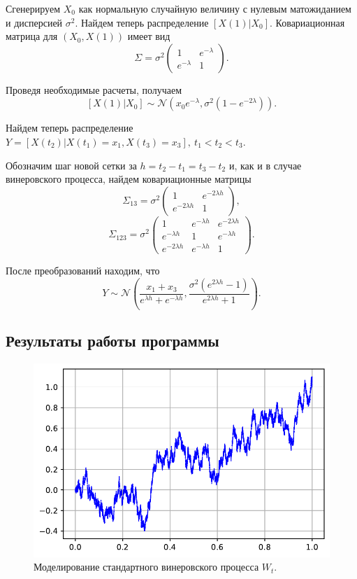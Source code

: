 \documentclass[16pt]{article}
\begin{document}
Сгенерируем $X_0$ как нормальную случайную величину с нулевым матожиданием и дисперсией $\sigma^2$.
Найдем теперь распределение $[X(1)|X_0]$.
Ковариационная матрица для $(X_0, X(1))$ имеет вид 
$$
\Sigma = \sigma^2 \begin{pmatrix} 
1 & e^{-\lambda} \\
e^{-\lambda} & 1
\end{pmatrix}.
$$

Проведя необходимые расчеты, получаем $$[X(1)|X_0] \sim \mathcal{N}\left(x_0e^{-\lambda}, \sigma^2 (1 -e^{-2\lambda})\right).$$

Найдем теперь распределение $Y = [X(t_2)|X(t_1) = x_1, X(t_3) = x_3],\ t_1 < t_2 < t_3$.

Обозначим шаг новой сетки за $h = t_2 - t_1 = t_3 - t_2$ и, как и в случае винеровского процесса, найдем ковариационные матрицы
$$
\Sigma_{13} = \sigma^2 \begin{pmatrix} 
1 & e^{-2\lambda h} \\
e^{-2 \lambda h} & 1
\end{pmatrix},
$$
$$
\Sigma_{123} = \sigma^2 \begin{pmatrix}
1 & e^{-\lambda h} & e^{-2 \lambda h} \\
e^{-\lambda h} & 1 & e^{-\lambda h} \\
e^{-2\lambda h} & e^{-\lambda h} & 1
\end{pmatrix}.
$$

После преобразований находим, что $$Y \sim \mathcal{N}\left(\dfrac{x_1 + x_3}{e^{\lambda h} + e^{-\lambda h}},\dfrac{\sigma^2 (e^{2\lambda h} - 1)}{e^{2\lambda h} + 1}\right).$$
\subsection{Результаты работы программы}
\begin{figure}
	\center
	\includegraphics[scale=0.7]{9_1.pdf}
	\caption{Моделирование стандартного винеровского процесса $W_t$.}
\end{figure}
\end{document}
